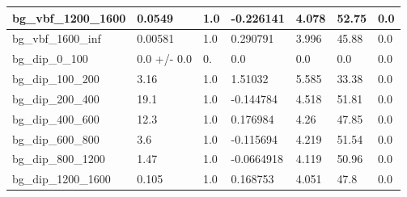 \documentclass[a4paper, 10pt]{article}
\begin{document}
\begin{table}[H]
\begin{center}
\begin{tabular}{|m{23.0mm}|m{23.0mm}|m{18.0mm}|m{19.0mm}|m{19.0mm}|m{19.0mm}|m{19.0mm}|}
      \hline
      {\cellcolor{white}         bg\_vbf\_1200\_1600}& {\cellcolor{white}         0.0549}& {\cellcolor{white}         1.0}& {\cellcolor{white}         -0.226141}& {\cellcolor{white}         4.078}& {\cellcolor{red}         52.75}& {\cellcolor{red}         0.0}\\
      \hline
      {\cellcolor{white}         bg\_vbf\_1600\_inf}& {\cellcolor{white}         0.00581}& {\cellcolor{white}         1.0}& {\cellcolor{white}         0.290791}& {\cellcolor{white}         3.996}& {\cellcolor{red}         45.88}& {\cellcolor{red}         0.0}\\
      \hline
      {\cellcolor{white}         bg\_dip\_0\_100}& {\cellcolor{white}         0.0 +/\-- 0.0}& {\cellcolor{white}         0.}& {\cellcolor{white}         0.0}& {\cellcolor{white}         0.0}& {\cellcolor{green}         0.0}& {\cellcolor{green}         0.0}\\
      \hline
      {\cellcolor{white}         bg\_dip\_100\_200}& {\cellcolor{white}         3.16}& {\cellcolor{white}         1.0}& {\cellcolor{white}         1.51032}& {\cellcolor{white}         5.585}& {\cellcolor{red}         33.38}& {\cellcolor{red}         0.0}\\
      \hline
      {\cellcolor{white}         bg\_dip\_200\_400}& {\cellcolor{white}         19.1}& {\cellcolor{white}         1.0}& {\cellcolor{white}         -0.144784}& {\cellcolor{white}         4.518}& {\cellcolor{red}         51.81}& {\cellcolor{red}         0.0}\\
      \hline
      {\cellcolor{white}         bg\_dip\_400\_600}& {\cellcolor{white}         12.3}& {\cellcolor{white}         1.0}& {\cellcolor{white}         0.176984}& {\cellcolor{white}         4.26}& {\cellcolor{red}         47.85}& {\cellcolor{red}         0.0}\\
      \hline
      {\cellcolor{white}         bg\_dip\_600\_800}& {\cellcolor{white}         3.6}& {\cellcolor{white}         1.0}& {\cellcolor{white}         -0.115694}& {\cellcolor{white}         4.219}& {\cellcolor{red}         51.54}& {\cellcolor{red}         0.0}\\
      \hline
      {\cellcolor{white}         bg\_dip\_800\_1200}& {\cellcolor{white}         1.47}& {\cellcolor{white}         1.0}& {\cellcolor{white}         -0.0664918}& {\cellcolor{white}         4.119}& {\cellcolor{red}         50.96}& {\cellcolor{red}         0.0}\\
      \hline
      {\cellcolor{white}         bg\_dip\_1200\_1600}& {\cellcolor{white}         0.105}& {\cellcolor{white}         1.0}& {\cellcolor{white}         0.168753}& {\cellcolor{white}         4.051}& {\cellcolor{red}         47.8}& {\cellcolor{red}         0.0}\\

\end{tabular}
\end{center}
\end{table}
\end{document}
